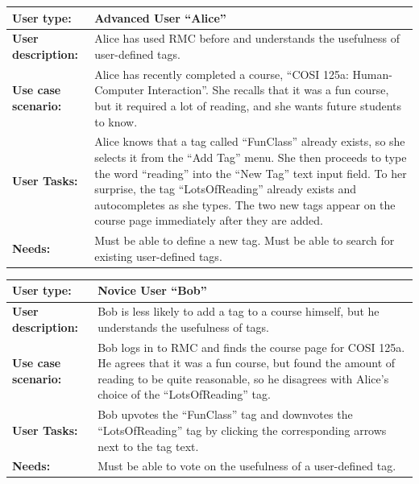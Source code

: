 \documentclass[12pt]{report}
\begin{document}
\begin{tabular}{|l|p{8cm}|}
\hline
\textbf{User type:}	& Advanced User ``Alice''\\
\hline
\textbf{User description:}	& Alice has used RMC before and understands the usefulness of user-defined tags. \\
\hline
\textbf{Use case scenario:}	& Alice has recently completed a course, ``COSI 125a: Human-Computer Interaction''. She recalls that it was a fun course, but it required a lot of reading, and she wants future students to know. \\
\hline
\textbf{User Tasks:}	&  Alice knows that a tag called ``FunClass'' already exists, so she selects it from the ``Add Tag'' menu. She then proceeds to type the word ``reading'' into the ``New Tag'' text input field. To her surprise, the tag ``LotsOfReading'' already exists and autocompletes as she types. The two new tags appear on the course page immediately after they are added. \\
\hline
\textbf{Needs: }	& Must be able to define a new tag. Must be able to search for existing user-defined tags. \\
\hline
\end{tabular}

\bigskip

\begin{tabular}{|l|p{8cm}|}
\hline
\textbf{User type:}	&  Novice User ``Bob''\\
\hline
\textbf{User description:}	&  Bob is less likely to add a tag to a course himself, but he understands the usefulness of tags. \\
\hline
\textbf{Use case scenario:}	&  Bob logs in to RMC and finds the course page for COSI 125a. He agrees that it was a fun course, but found the amount of reading to be quite reasonable, so he disagrees with Alice's choice of the ``LotsOfReading'' tag. \\
\hline
\textbf{User Tasks:}	&  Bob upvotes the ``FunClass'' tag and downvotes the ``LotsOfReading'' tag by clicking the corresponding arrows next to the tag text. \\
\hline
\textbf{Needs: }	& Must be able to vote on the usefulness of a user-defined tag.\\
\hline
\end{tabular}

\bigskip
\end{document}
